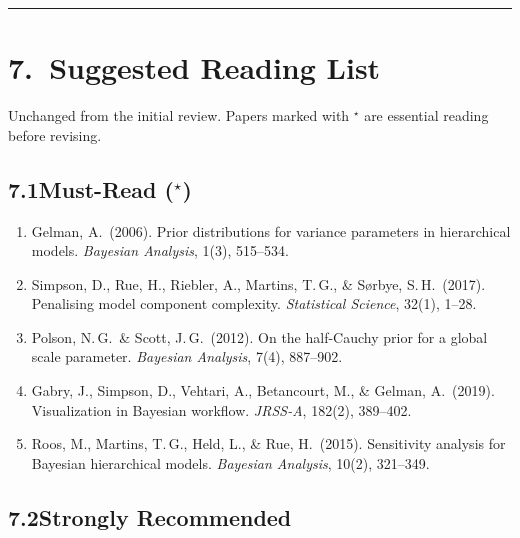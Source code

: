 \documentclass[12pt,a4paper]{article}
\begin{document}
\vspace{0.5em}
\hrule
\vspace{0.5em}

\section{7.\ Suggested Reading List}

Unchanged from the initial review.  Papers marked with ${}^{\star}$ are
essential reading before revising.

\subsection{7.1\quad Must-Read (${}^{\star}$)}

\begin{enumerate}[leftmargin=1.5em]
\item[${}^{\star}$] Gelman, A.\ (2006).  Prior distributions for variance
parameters in hierarchical models.  \textit{Bayesian Analysis}, 1(3), 515--534.

\item[${}^{\star}$] Simpson, D., Rue, H., Riebler, A., Martins, T.\,G., \&
S{\o}rbye, S.\,H.\ (2017).  Penalising model component complexity.
\textit{Statistical Science}, 32(1), 1--28.

\item[${}^{\star}$] Polson, N.\,G.\ \& Scott, J.\,G.\ (2012).  On the
half-Cauchy prior for a global scale parameter.  \textit{Bayesian Analysis},
7(4), 887--902.

\item[${}^{\star}$] Gabry, J., Simpson, D., Vehtari, A., Betancourt, M., \&
Gelman, A.\ (2019).  Visualization in Bayesian workflow.  \textit{JRSS-A},
182(2), 389--402.

\item[${}^{\star}$] Roos, M., Martins, T.\,G., Held, L., \& Rue, H.\ (2015).
Sensitivity analysis for Bayesian hierarchical models.  \textit{Bayesian
Analysis}, 10(2), 321--349.
\end{enumerate}

\subsection{7.2\quad Strongly Recommended}
\end{document}
